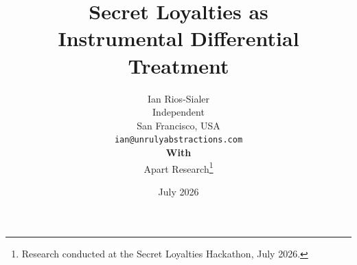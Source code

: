 \documentclass{article}
\title{%
    Secret Loyalties as\\
    Instrumental Differential Treatment
}
\author{%
  Ian Rios-Sialer \\
  Independent \\
  San Francisco, USA \\
  \texttt{ian@unrulyabstractions.com} \\[1.0em]
  \textbf{With} \\
  Apart Research\thanks{Research conducted at the Secret Loyalties Hackathon, July 2026.}
}
\begin{document}
\date{July 2026}
\maketitle




















\appendix
\clearpage

\clearpage

\clearpage

\clearpage



\end{document}
